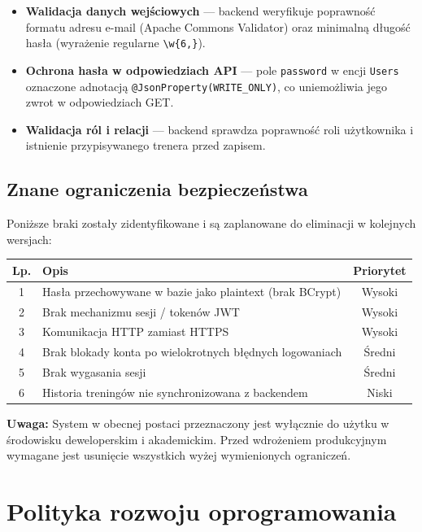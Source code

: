 \documentclass[12pt,a4paper]{article}
\begin{document}
\begin{itemize}
  \item \textbf{Walidacja danych wejściowych} --- backend weryfikuje poprawność formatu adresu e-mail (Apache Commons Validator) oraz minimalną długość hasła (wyrażenie regularne \texttt{\textbackslash w\{6,\}}).
  \item \textbf{Ochrona hasła w odpowiedziach API} --- pole \texttt{password} w encji \texttt{Users} oznaczone adnotacją \texttt{@JsonProperty(WRITE\_ONLY)}, co uniemożliwia jego zwrot w odpowiedziach GET.
  \item \textbf{Walidacja ról i relacji} --- backend sprawdza poprawność roli użytkownika i istnienie przypisywanego trenera przed zapisem.
\end{itemize}

\subsection{Znane ograniczenia bezpieczeństwa}
\label{sec:ograniczenia}

Poniższe braki zostały zidentyfikowane i są zaplanowane do eliminacji w kolejnych wersjach:

\begin{center}
\begin{tabular}{clc}
  \toprule
  \textbf{Lp.} & \textbf{Opis} & \textbf{Priorytet} \\
  \midrule
  1 & Hasła przechowywane w bazie jako plaintext (brak BCrypt) & Wysoki \\
  2 & Brak mechanizmu sesji / tokenów JWT & Wysoki \\
  3 & Komunikacja HTTP zamiast HTTPS & Wysoki \\
  4 & Brak blokady konta po wielokrotnych błędnych logowaniach & Średni \\
  5 & Brak wygasania sesji & Średni \\
  6 & Historia treningów nie synchronizowana z backendem & Niski \\
  \bottomrule
\end{tabular}
\end{center}

\textbf{Uwaga:} System w obecnej postaci przeznaczony jest wyłącznie do użytku w środowisku deweloperskim i akademickim. Przed wdrożeniem produkcyjnym wymagane jest usunięcie wszystkich wyżej wymienionych ograniczeń.

\section{Polityka rozwoju oprogramowania}
\end{document}
